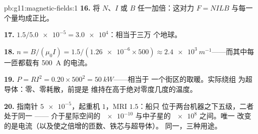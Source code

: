 \begin{solution}{pb:g11:magnetic-fields:1}
\textbf{16.} 将 $N$、$I$ 或 $B$ 任一加倍：这对力
$F = NILB$ 与每一个量均成正比。

\textbf{17.} $1.5 / \num{5.0e-5} = \num{3.0e4}$：相当于三万
个地球。

\textbf{18.} $n = B/(\mu_0 I) = 1.5 / (\num{1.26e-6} \times 500)
\approx \qty{2.4e3}{m^{-1}}$——而其中每一匝都载有
\qty{500}{A} 的电流。

\textbf{19.} $P = RI^2 = 0.20 \times 500^2 = \qty{50}{kW}$——相当于
一个街区的取暖。实际绕组
为超导体：零、零耗散，前提是
维持在高于绝对零度几度的温度。

\textbf{20.} 指南针 $\num{5e-5}$，起重机 $1$，MRI $1.5$：船只
位于两台机器之下五级，二者处于同一 ——
介于星际空间的 $\num{e-10}$ 与中子星的 $\num{e8}$ 之间。唯一
改变的是电流（以及使之倍增的匝数、铁芯与超导体）。
同一，三种用途。
\end{solution}
